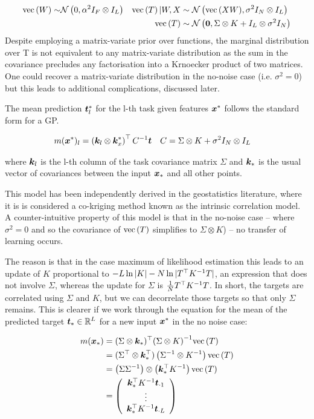 \begin{align}
\text{vec}\left(W\right) \sim & \mathcal{N} \left( {0}, {\alpha^2 I_F \otimes I_L} \right) & 
\text{vec}\left(T\right)|W,X & \sim \mathcal{N} \left( {\text{vec}\left(XW\right)}, {\sigma^2 I_N \otimes I_L} \right) \\
& & \text{vec}\left(T\right) & \sim \mathcal{N} \left( {\bm 0}, {\Sigma \otimes K + I_L \otimes \sigma^2I_N} \right)
\end{align}
Despite employing a matrix-variate prior over functions, the marginal distribution over T is not equivalent to any matrix-variate distribution as the sum in the covariance precludes any factorisation into a Krnoecker product of two matrices. One could recover a matrix-variate distribution in the no-noise case (i.e. $\sigma^2 = 0$) but this leads to additional complications, discussed later.

The mean prediction $\bm t_l^*$ for the l-th task given features $\bm x^*$ follows the standard form for a GP.

\begin{align}
m(\bm x^*)_l & = \left(\bm k_l \otimes \bm k_x^* \right)^\top{C}^{-1} \bm t & C & = \Sigma \otimes K + \sigma^2 I_N \otimes I_L
\end{align}

where $\bm k_l$ is the l-th column of the task covariance matrix $\Sigma$ and $\bm k_*$ is the usual vector of covariances between the input $\bm x_*$ and all other points.

This model has been independently derived in the geostatistics literature, where it is is considered a co-kriging method known as the intrinsic correlation model\cite{Wackernagel1998}. A counter-intuitive property of this model is that in the no-noise case -- where $\sigma^2 = 0$ and so the covariance of $\text{vec}\left(T\right)$ simplifies to $\Sigma \otimes K$) -- no transfer of learning occurs. 

The reason is that in the case maximum of likelihood estimation this leads to an update of $K$ proportional to $-L \ln |K| - N \ln |T^\top {K}^{-1} T|$, an expression that does not involve $\Sigma$, whereas the update for $\Sigma$ is $\frac{1}{N}T^\top {K}^{-1} T$. In short, the targets are correlated using $\Sigma$ and $K$, but we can decorrelate those targets so that only $\Sigma$ remains. This is clearer if we work through the equation for the mean of the predicted target $\bm t_* \in { \mathbb{R}^{L} }$ for a new input $\bm x^*$ in the no noise case:

\begin{align}
m(\bm x_*) & = (\Sigma \otimes \bm k_*)^\top{\left( \Sigma \otimes K \right)}^{-1}\text{vec}\left(T\right) \\
& = (\Sigma^\top \otimes \bm k_*^\top)\left({\Sigma}^{-1} \otimes {K}^{-1}\right)\text{vec}\left(T\right)\\
& = \left(\Sigma {\Sigma}^{-1} \right) \otimes \left(\bm k_*^\top {K}^{-1}\right)\text{vec}\left(T\right) \\
& = \left( \begin{array}{c}
     \bm k_*^\top {K}^{-1} \bm t_{\cdot 1} \\
     \vdots \\
     \bm k_*^\top {K}^{-1} \bm t_{\cdot L} \\
 \end{array}\right) \\
\end{align}

